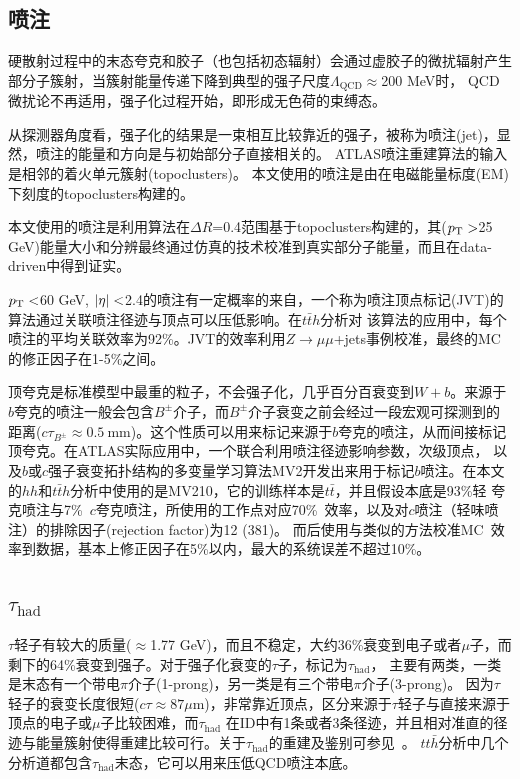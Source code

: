 \subsection{喷注}\label{subsec:jet_reco}
硬散射过程中的末态夸克和胶子（也包括初态辐射）会通过虚胶子的微扰辐射产生部分子簇射，当簇射能量传递下降到典型的强子尺度$\Lambda_{\text{QCD}}\approx$200 MeV时，%
QCD微扰论不再适用，强子化过程开始，即形成无色荷的束缚态。

从探测器角度看，强子化的结果是一束相互比较靠近的强子，被称为喷注(jet)，显然，喷注的能量和方向是与初始部分子直接相关的。
ATLAS喷注重建算法的输入是相邻的着火单元簇射(topoclusters)\cite{Aad:2016upy}。
本文使用的喷注是由在电磁能量标度(EM)下刻度的topoclusters构建的。

本文使用的喷注是利用\antikt 算法\cite{Cacciari:2008gp}在$\Delta R$=0.4范围基于topoclusters构建的，其($p_{\text{T}}>$25 GeV)能量大小和分辨最终通过仿真的技术校准到真实部分子能量，而且在data-driven中得到证实\cite{TheATLAScollaboration:2015soq,TheATLAScollaboration:2013pia}。

$p_{\text{T}}<$60 GeV, $|\eta|<$2.4的喷注有一定概率的来自\pileup ，一个称为喷注顶点标记(JVT)\cite{ATLAS:2014cva}的算法通过关联喷注径迹与顶点可以压低\pileup 影响。在$t\bar{t}h$分析对
该算法的应用中，每个喷注的平均关联效率为92\%。JVT的效率利用$Z\rightarrow \mu\mu$+jets事例校准，最终的MC的修正因子在1-5\%之间。

顶夸克是标准模型中最重的粒子，不会强子化，几乎百分百衰变到$W+b$。来源于$b$夸克的喷注一般会包含$B^{\pm}$介子，而$B^{\pm}$介子衰变之前会经过一段宏观可探测到的距离($c\tau_{B^{\pm}}\approx0.5~\text{mm}$)。这个性质可以用来标记来源于$b$夸克的喷注，从而间接标记顶夸克。在ATLAS实际应用中，一个联合利用喷注径迹影响参数，次级顶点，
以及$b$或$c$强子衰变拓扑结构的多变量学习算法MV2\cite{ATL-PHYS-PUB-2015-022,ATL-PHYS-PUB-2016-012}开发出来用于标记$b$喷注。在本文的$hh$和$t\bar{t}h$分析中使用的是MV210，它的训练样本是$t\bar{t}$，并且假设本底是93\%轻
夸克喷注与7\%~$c$夸克喷注，所使用的工作点对应70\%~\btag 效率，以及对$c$喷注（轻味喷注）的排除因子(rejection factor)为12 (381)。
而后使用与\RunOne 类似的方法\cite{Aad:2015ydr}校准MC~\btag 效率到数据，基本上修正因子在5\%以内，最大的系统误差不超过10\%。

\subsection{$\tau_{\text{had}}$}
$\tau$轻子有较大的质量($\approx$1.77 GeV)，而且不稳定，大约36\%衰变到电子或者$\mu$子，而剩下的64\%衰变到强子。对于强子化衰变的$\tau$子，标记为$\tau_{\text{had}}$，
主要有两类，一类是末态有一个带电$\pi$介子(1-prong)，另一类是有三个带电$\pi$介子(3-prong)。
因为$\tau$轻子的衰变长度很短($c\tau\approx87\mu$m)，非常靠近顶点，区分来源于$\tau$轻子与直接来源于顶点的电子或$\mu$子比较困难，而$\tau_{\text{had}}$
在ID中有1条或者3条径迹，并且相对准直的径迹与能量簇射使得重建比较可行。关于$\tau_{\text{had}}$的重建及鉴别可参见~\cite{ATL-PHYS-PUB-2015-045}。
$tt\bar{h}$分析中几个分析道都包含$\tau_{\text{had}}$末态，它可以用来压低QCD喷注本底。

